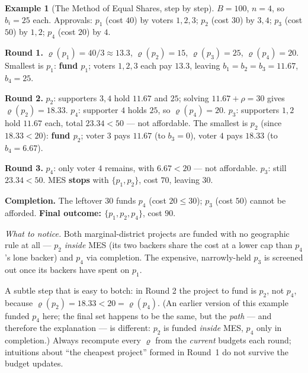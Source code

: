 \documentclass[11pt,letterpaper]{article}
\theoremstyle{definition}
\newtheorem{example}{Example}[section]
\theoremstyle{plain}
\theoremstyle{remark}
\newcommand{\budget}{B}
\newcommand{\mesrho}{\varrho}      %
\begin{document}
\begin{example}[The Method of Equal Shares, step by step]
\label{ex:mes}
$\budget=100$, $n=4$, so $b_i=25$ each. Approvals: $p_1$ (cost $40$) by voters $1,2,3$; $p_2$
(cost $30$) by $3,4$; $p_3$ (cost $50$) by $1,2$; $p_4$ (cost $20$) by $4$.

\smallskip\noindent\textbf{Round 1.}
$\mesrho(p_1)=40/3\approx13.3$, $\mesrho(p_2)=15$, $\mesrho(p_3)=25$, $\mesrho(p_4)=20$.
Smallest is $p_1$: \textbf{fund $p_1$}; voters $1,2,3$ each pay $13.3$, leaving
$b_1=b_2=b_3=11.67$, $b_4=25$.

\smallskip\noindent\textbf{Round 2.}
$p_2$: supporters $3,4$ hold $11.67$ and $25$; solving $11.67+\rho=30$ gives $\mesrho(p_2)=18.33$.
$p_4$: supporter $4$ holds $25$, so $\mesrho(p_4)=20$.
$p_3$: supporters $1,2$ hold $11.67$ each, total $23.34<50$ --- not affordable.
The smallest is $p_2$ (since $18.33<20$): \textbf{fund $p_2$}; voter $3$ pays $11.67$ (to $b_3=0$),
voter $4$ pays $18.33$ (to $b_4=6.67$).

\smallskip\noindent\textbf{Round 3.}
$p_4$: only voter $4$ remains, with $6.67<20$ --- not affordable. $p_3$: still $23.34<50$. MES
\textbf{stops} with $\{p_1,p_2\}$, cost $70$, leaving $30$.

\smallskip\noindent\textbf{Completion.} The leftover $30$ funds $p_4$ (cost $20\le30$); $p_3$
(cost $50$) cannot be afforded. \textbf{Final outcome: $\{p_1,p_2,p_4\}$}, cost $90$.

\smallskip\noindent\emph{What to notice.} Both marginal-district projects are funded with no
geographic rule at all --- $p_2$ \emph{inside} MES (its two backers share the cost at a lower cap
than $p_4$'s lone backer) and $p_4$ via completion. The expensive, narrowly-held $p_3$ is screened
out once its backers have spent on $p_1$.
\end{example}

\begin{watchout}
A subtle step that is easy to botch: in Round 2 the project to fund is $p_2$, not $p_4$, because
$\mesrho(p_2)=18.33<20=\mesrho(p_4)$. (An earlier version of this example funded $p_4$ here; the
final set happens to be the same, but the \emph{path} --- and therefore the explanation --- is
different: $p_2$ is funded \emph{inside} MES, $p_4$ only in completion.) Always recompute every
$\mesrho$ from the \emph{current} budgets each round; intuitions about ``the cheapest project''
formed in Round~1 do not survive the budget updates.
\end{watchout}
\end{document}
